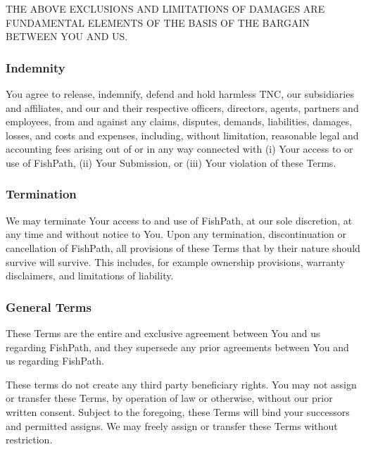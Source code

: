 \documentclass[
  11pt,
]{book}
\begin{document}
THE ABOVE EXCLUSIONS AND LIMITATIONS OF DAMAGES ARE FUNDAMENTAL ELEMENTS OF THE BASIS OF THE BARGAIN BETWEEN YOU AND US.

\hypertarget{indemnity}{%
\subsubsection*{Indemnity}\label{indemnity}}

You agree to release, indemnify, defend and hold harmless TNC, our subsidiaries and affiliates, and our and their respective officers, directors, agents, partners and employees, from and against any claims, disputes, demands, liabilities, damages, losses, and costs and expenses, including, without limitation, reasonable legal and accounting fees arising out of or in any way connected with (i) Your access to or use of FishPath, (ii) Your Submission, or (iii) Your violation of these Terms.

\hypertarget{termination}{%
\subsubsection*{Termination}\label{termination}}

We may terminate Your access to and use of FishPath, at our sole discretion, at any time and without notice to You. Upon any termination, discontinuation or cancellation of FishPath, all provisions of these Terms that by their nature should survive will survive. This includes, for example ownership provisions, warranty disclaimers, and limitations of liability.

\hypertarget{general-terms}{%
\subsubsection*{General Terms}\label{general-terms}}

These Terms are the entire and exclusive agreement between You and us regarding FishPath, and they supersede any prior agreements between You and us regarding FishPath.

These terms do not create any third party beneficiary rights. You may not assign or transfer these Terms, by operation of law or otherwise, without our prior written consent. Subject to the foregoing, these Terms will bind your successors and permitted assigns. We may freely assign or transfer these Terms without restriction.
\end{document}
